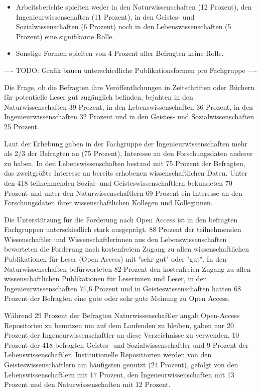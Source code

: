 \begin{itemize}
 \item  Arbeitsberichte spielten weder in den Naturwissenschaften (12 Prozent), den Ingenieurwissenschaften (11 Prozent), in den Geistes- und Sozialwissenschaften (6 Prozent) noch in den Lebenswissenschaften (5 Prozent) eine signifikante Rolle.
 \item Sonstige Formen spielten von 4 Prozent aller Befragten keine Rolle.
 \end{itemize}

---- TODO: Grafik bauen unterschiedliche Publikationsformen pro Fachgruppe ----

Die Frage, ob die Befragten ihre Veröffentlichungen in Zeitschriften oder Büchern für potentielle Leser gut zugänglich befinden, bejahten in den Naturwissenschaften 39 Prozent, in den Lebenswissenschaften 36 Prozent, in den Ingenieurwissenschaften 32 Prozent und in den Geistes- und Sozialwissenschaften 25 Prozent.

Laut der Erhebung gaben in der Fachgruppe der Ingenieurwissenschaften mehr als 2/3 der Befragten an (75 Prozent), Interesse an den Forschungsdaten anderer zu haben. In den Lebenswissenschaften bestand mit 75 Prozent der Befragten, das zweitgrößte Interesse an bereits erhobenen wissenschaftlichen Daten. Unter den 418 teilnehmenden Sozial- und Geisteswissenschaftlern bekundeten 70 Prozent und unter den Naturwissenschaftlern 69 Prozent ein Interesse an den Forschungsdaten ihrer wissenschaftlichen Kollegen und Kolleginnen.

Die Unterstützung für die Forderung nach Open Access ist in den befragten Fachgruppen unterschiedlich stark ausgeprägt. 88 Prozent der teilnehmenden Wissenschaftler und Wissenschaftlerinnen aus den Lebenswissenschaften bewerteten die Forderung nach kostenfreiem Zugang zu allen wissenschaftlichen Publikationen für Leser (Open Access) mit "sehr gut" oder "gut". In den Naturwissenschaften befürworteten 82 Prozent den kostenfreien Zugang zu allen wissenschaftlichen Publikationen für Leserinnen und Leser, in den Ingenieurwissenschaften 71,6 Prozent und in Geisteswissenschaften hatten 68 Prozent der Befragten eine gute oder sehr gute Meinung zu Open Access.

Während 29 Prozent der Befragten Naturwissenschaftler angab Open-Access Repositorien zu benutzen um auf dem Laufenden zu bleiben, gaben nur 20 Prozent der Ingeneurwissenschaftler an diese Verzeichnisse zu verwenden, 10 Prozent der 418 befragten Geistes- und Sozialwissenschaftler und 9 Prozent der Lebenswissenschaftler. Institutionelle Repositiorien werden von den Geisteswissenschaftlern am häufigsten genutzt (24 Prozent), gefolgt von den Lebenswissenschaftlern mit 17 Prozent, den Ingeneurwissenschaften  mit 13 Prozent und den Naturwissenschaften mit 12 Prozent.

